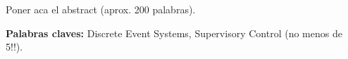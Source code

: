 \chapter*{\runtitulo}

\noindent Poner aca el abstract (aprox. 200 palabras).

\bigskip

\noindent\textbf{Palabras claves:} Discrete Event Systems, Supervisory Control (no menos de 5!!).